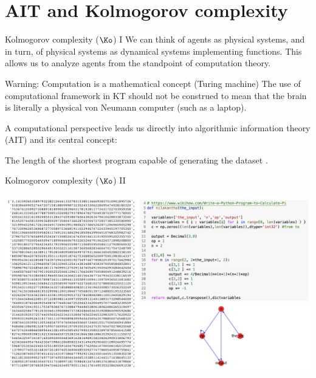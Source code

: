 \section{AIT and Kolmogorov complexity}
\begin{frame}[label=intro3]{Kolmogorov complexity ($\Ko$) I}
 We can think of agents as physical systems, and in turn,  of physical systems as dynamical systems implementing functions.   This allows us to analyze agents from the standpoint of computation theory.
 \begin{alertblock}{Warning: Computation is a mathematical concept (Turing machine)}
The use of computational framework  in KT should not be construed to mean that the brain is literally a physical von Neumann computer (such as a laptop).
\end{alertblock}\vfill 
 
A computational perspective  leads us directly into algorithmic information theory (AIT) and its central concept: 


\begin{definition}
The length of the shortest program capable of generating  the dataset \citep{Kolomgorov1965,Cover:2006aa}.  
\end{definition} \vfill

\end{frame}


\begin{frame}[label=intro3]{Kolmogorov complexity ($\Ko$) II}
 \begin{center}%
  \includegraphics[height=7.cm]{img/pi.png}
  \end{center}
\end{frame}

